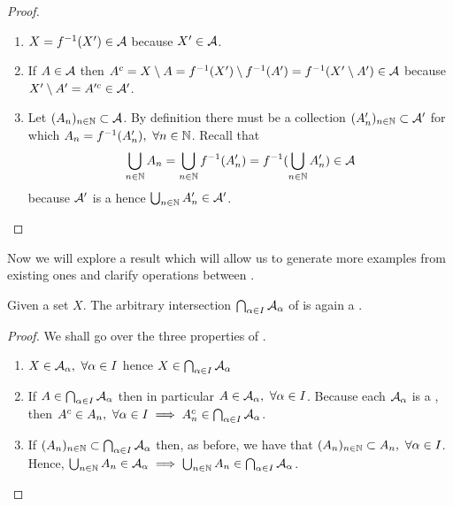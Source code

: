\begin{eg}
\begin{enumerate}
		\begin{proof}
			\begin{enumerate}
				\item $X = f^{-1}(X') \in \mathcal{A}$ because $X' \in \mathcal{A}$.
				\item If $A \in \mathcal{A}$ then $A^c = X \setminus A = f^{-1}(X')\setminus f^{-1} (A') = f^{-1}(X' \setminus A') \in \mathcal{A}$ because $X' \setminus A' = A'^c \in \mathcal{A}'$.
				\item Let $(A_n)_{n \in \mathbb{N}} \subset \mathcal{A}$. By definition there must be a collection $(A_n')_{n \in \mathbb{N}} \subset \mathcal{A}'$ for which $A_n = f^{-1}(A_n'),\ \forall n \in \mathbb{N}$. Recall that
				\begin{align*}
					\bigcup_{n \in \mathbb{N}} A_n = \bigcup_{n \in \mathbb{N}} f^{-1}(A_n') = f^{-1} (\bigcup_{n \in \mathbb{N}} A_n') \in \mathcal{A}
				\end{align*} because $\mathcal{A}'$ is a \siga hence $\bigcup_{n \in \mathbb{N}} A_n' \in \mathcal{A}'$.
			\end{enumerate}
		\end{proof}
	\end{enumerate}
\end{eg}

Now we will explore a result which will allow us to generate more examples from existing ones and clarify operations between \sigas.

\begin{thm}
	Given a set $X$. The arbitrary intersection $\bigcap_{\alpha \in I} \mathcal{A}_\alpha$ of \sigas is again a \siga.

	\begin{proof}
		We shall go over the three properties of \sigas.
		\begin{enumerate}
			\item $X \in \mathcal{A}_\alpha,\ \forall \alpha \in I$ hence $X \in \bigcap_{\alpha \in I} \mathcal{A}_\alpha$
			\item If $A \in \bigcap_{\alpha \in I} \mathcal{A}_\alpha$ then in particular $A \in \mathcal{A}_\alpha,\ \forall \alpha \in I$. Because each $\mathcal{A}_\alpha$ is a \siga, then $A^c \in A_n,\ \forall \alpha \in I \implies A_n^c \in \bigcap_{\alpha \in I} \mathcal{A}_\alpha$.
			\item If $(A_n)_{n\in \mathbb{N}} \subset \bigcap_{\alpha \in I} \mathcal{A}_\alpha$ then, as before, we have that $(A_n)_{n \in \mathbb{N}} \subset A_n,\ \forall \alpha \in I$. Hence, $\bigcup_{n \in \mathbb{N}} A_n \in \mathcal{A}_\alpha \implies \bigcup_{n \in \mathbb{N}} A_n \in \bigcap_{\alpha \in I} \mathcal{A}_\alpha$.
		\end{enumerate}
	\end{proof}
\end{thm}

